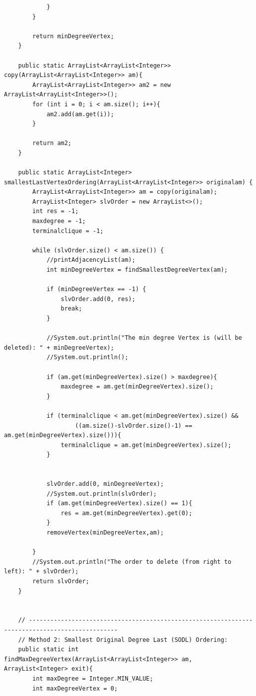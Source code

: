 \documentclass{article}
\begin{document}
\begin{verbatim}
            }
        }

        return minDegreeVertex;
    }

    public static ArrayList<ArrayList<Integer>> copy(ArrayList<ArrayList<Integer>> am){
        ArrayList<ArrayList<Integer>> am2 = new ArrayList<ArrayList<Integer>>();
        for (int i = 0; i < am.size(); i++){
            am2.add(am.get(i));
        }

        return am2;
    }

    public static ArrayList<Integer> smallestLastVertexOrdering(ArrayList<ArrayList<Integer>> originalam) {
        ArrayList<ArrayList<Integer>> am = copy(originalam);
        ArrayList<Integer> slvOrder = new ArrayList<>();
        int res = -1;
        maxdegree = -1;
        terminalclique = -1;

        while (slvOrder.size() < am.size()) {
            //printAdjacencyList(am);
            int minDegreeVertex = findSmallestDegreeVertex(am);

            if (minDegreeVertex == -1) {
                slvOrder.add(0, res);
                break;
            }

            //System.out.println("The min degree Vertex is (will be deleted): " + minDegreeVertex);
            //System.out.println();

            if (am.get(minDegreeVertex).size() > maxdegree){
                maxdegree = am.get(minDegreeVertex).size();
            }

            if (terminalclique < am.get(minDegreeVertex).size() &&
                    ((am.size()-slvOrder.size()-1) == am.get(minDegreeVertex).size())){
                terminalclique = am.get(minDegreeVertex).size();
            }


            slvOrder.add(0, minDegreeVertex);
            //System.out.println(slvOrder);
            if (am.get(minDegreeVertex).size() == 1){
                res = am.get(minDegreeVertex).get(0);
            }
            removeVertex(minDegreeVertex,am);

        }
        //System.out.println("The order to delete (from right to left): " + slvOrder);
        return slvOrder;
    }


    // -----------------------------------------------------------------------------------------------
    // Method 2: Smallest Original Degree Last (SODL) Ordering:
    public static int findMaxDegreeVertex(ArrayList<ArrayList<Integer>> am, ArrayList<Integer> exit){
        int maxDegree = Integer.MIN_VALUE;
        int maxDegreeVertex = 0;


\end{verbatim}
\end{document}

